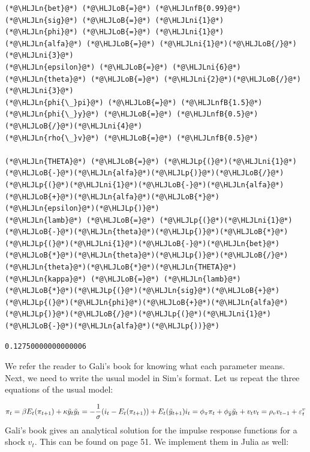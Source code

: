 \documentclass[12pt,a4paper]{article}
\newcommand{\HLJLn}[1]{#1}
\newcommand{\HLJLnfB}[1]{\textcolor[RGB]{59,151,46}{#1}}
\newcommand{\HLJLni}[1]{\textcolor[RGB]{59,151,46}{#1}}
\newcommand{\HLJLoB}[1]{\textcolor[RGB]{102,102,102}{\textbf{#1}}}
\newcommand{\HLJLp}[1]{#1}
\begin{document}
\begin{lstlisting}
(*@\HLJLn{bet}@*) (*@\HLJLoB{=}@*) (*@\HLJLnfB{0.99}@*)
(*@\HLJLn{sig}@*) (*@\HLJLoB{=}@*) (*@\HLJLni{1}@*)
(*@\HLJLn{phi}@*) (*@\HLJLoB{=}@*) (*@\HLJLni{1}@*)
(*@\HLJLn{alfa}@*) (*@\HLJLoB{=}@*) (*@\HLJLni{1}@*)(*@\HLJLoB{/}@*)(*@\HLJLni{3}@*)
(*@\HLJLn{epsilon}@*) (*@\HLJLoB{=}@*) (*@\HLJLni{6}@*)
(*@\HLJLn{theta}@*) (*@\HLJLoB{=}@*) (*@\HLJLni{2}@*)(*@\HLJLoB{/}@*)(*@\HLJLni{3}@*)
(*@\HLJLn{phi{\_}pi}@*) (*@\HLJLoB{=}@*) (*@\HLJLnfB{1.5}@*)
(*@\HLJLn{phi{\_}y}@*) (*@\HLJLoB{=}@*) (*@\HLJLnfB{0.5}@*)(*@\HLJLoB{/}@*)(*@\HLJLni{4}@*)
(*@\HLJLn{rho{\_}v}@*) (*@\HLJLoB{=}@*) (*@\HLJLnfB{0.5}@*)

(*@\HLJLn{THETA}@*) (*@\HLJLoB{=}@*) (*@\HLJLp{(}@*)(*@\HLJLni{1}@*)(*@\HLJLoB{-}@*)(*@\HLJLn{alfa}@*)(*@\HLJLp{)}@*)(*@\HLJLoB{/}@*)(*@\HLJLp{(}@*)(*@\HLJLni{1}@*)(*@\HLJLoB{-}@*)(*@\HLJLn{alfa}@*)(*@\HLJLoB{+}@*)(*@\HLJLn{alfa}@*)(*@\HLJLoB{*}@*)(*@\HLJLn{epsilon}@*)(*@\HLJLp{)}@*)
(*@\HLJLn{lamb}@*) (*@\HLJLoB{=}@*) (*@\HLJLp{(}@*)(*@\HLJLni{1}@*)(*@\HLJLoB{-}@*)(*@\HLJLn{theta}@*)(*@\HLJLp{)}@*)(*@\HLJLoB{*}@*)(*@\HLJLp{(}@*)(*@\HLJLni{1}@*)(*@\HLJLoB{-}@*)(*@\HLJLn{bet}@*)(*@\HLJLoB{*}@*)(*@\HLJLn{theta}@*)(*@\HLJLp{)}@*)(*@\HLJLoB{/}@*)(*@\HLJLn{theta}@*)(*@\HLJLoB{*}@*)(*@\HLJLn{THETA}@*)
(*@\HLJLn{kappa}@*) (*@\HLJLoB{=}@*) (*@\HLJLn{lamb}@*)(*@\HLJLoB{*}@*)(*@\HLJLp{(}@*)(*@\HLJLn{sig}@*)(*@\HLJLoB{+}@*)(*@\HLJLp{(}@*)(*@\HLJLn{phi}@*)(*@\HLJLoB{+}@*)(*@\HLJLn{alfa}@*)(*@\HLJLp{)}@*)(*@\HLJLoB{/}@*)(*@\HLJLp{(}@*)(*@\HLJLni{1}@*)(*@\HLJLoB{-}@*)(*@\HLJLn{alfa}@*)(*@\HLJLp{))}@*)
\end{lstlisting}

\begin{lstlisting}
0.12750000000000006
\end{lstlisting}


We refer the reader to Gali's book for knowing what each parameter means. Next, we need to write the usual model in Sim's format. Let us repeat the three equations of the usual model:

\[
\pi_t = \beta E_t(\pi_{t+1}) + \kappa \tilde{y}_t\\
\tilde{y}_t = -\frac{1}{\sigma} (i_t - E_t(\pi_{t+1})) + E_t(\tilde{y}_{t+1})\\
i_t = \phi_{\pi} \pi_t + \phi_{\tilde{y}} \tilde{y}_t + v_t\\
v_t = \rho_v v_{t-1} + \varepsilon_t^v
\]
Gali's book gives an analytical solution for the impulse response functions for a shock $v_t$. This can be found on page 51. We implement them in Julia as well:
\end{document}
